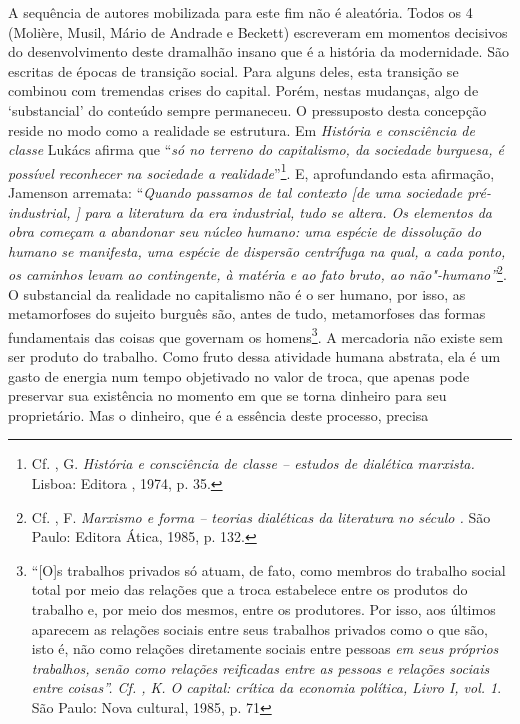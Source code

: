 {A sequência de autores mobilizada para este fim não é aleatória. Todos
os 4 (Molière, Musil, Mário de Andrade e Beckett) escreveram em momentos
decisivos do desenvolvimento deste dramalhão insano que é a história da
modernidade. São escritas de épocas de transição social. Para alguns
deles, esta transição se combinou com tremendas crises do capital.
Porém, nestas mudanças, algo de `substancial' do conteúdo sempre
permaneceu. O pressuposto desta concepção reside no modo como a
realidade se estrutura. Em \emph{História e consciência de classe}
Lukács afirma que ``\emph{só no terreno do capitalismo, da sociedade
burguesa, é possível reconhecer na sociedade a realidade}''\footnote{Cf.
  , G. \emph{\emph{História e consciência de classe -- estudos
  de dialética marxista}.} Lisboa: Editora , 1974, p. 35.}. E,
aprofundando esta afirmação, Jamenson arremata: ``\emph{Quando passamos
de tal contexto [de uma sociedade pré-industrial, ] para a
literatura da era industrial, tudo se altera. Os elementos da obra
começam a abandonar seu núcleo humano: uma espécie de dissolução do
humano se manifesta, uma espécie de dispersão centrífuga na qual, a cada
ponto, os caminhos levam ao contingente, à matéria e ao fato bruto, ao
não"-humano''}\footnote{Cf. , F. \emph{\emph{Marxismo e forma --
  teorias dialéticas da literatura no século }.} São Paulo: Editora
  Ática, 1985, p. 132.}. O substancial da realidade no capitalismo não é
o ser humano, por isso, as metamorfoses do sujeito burguês são, antes de
tudo, metamorfoses das formas fundamentais das coisas que governam os
homens\footnote{``[O]s trabalhos privados só atuam, de fato, como
  membros do trabalho social total por meio das relações que a troca
  estabelece entre os produtos do trabalho e, por meio dos mesmos, entre
  os produtores. Por isso, aos últimos aparecem as relações sociais
  entre seus trabalhos privados como o que são, isto é, não como
  relações diretamente sociais entre pessoas \emph{em seus próprios
  trabalhos, senão como relações reificadas entre as pessoas e relações
  sociais entre coisas''. Cf. , K. \emph{O capital: crítica da
  economia política, }}\emph{Livro I, vol. 1}. São Paulo: Nova
  cultural, 1985, p. 71}. A mercadoria não existe sem ser produto do
trabalho. Como fruto dessa atividade humana abstrata, ela é um gasto de
energia num tempo objetivado no valor de troca, que apenas pode
preservar sua existência no momento em que se torna dinheiro para seu
proprietário. Mas o dinheiro, que é a essência deste processo, precisa
}
